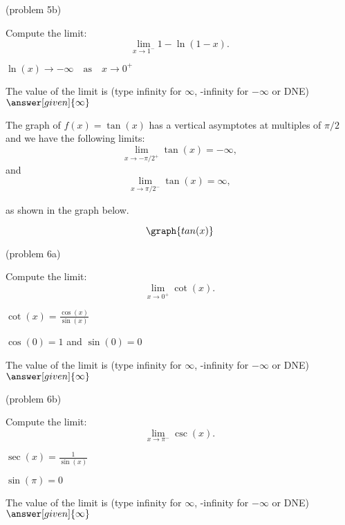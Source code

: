 \documentclass{ximera}
\begin{document}
\begin{problem}(problem 5b)
  
	Compute the limit:
  \[
  \lim_{x \to {1^-}} 1 - \ln(1-x).
  \]
		\begin{hint}
		  $\ln(x) \to -\infty \quad \text{as} \quad x \to 0^+$
		\end{hint}	
		The value of the limit is
		(type infinity for $\infty$, -infinity for $-\infty$ or DNE)
		 $\answer[given]{\infty}$
		
\end{problem}

\begin{example}[example 6]
The graph of $f(x) = \tan(x)$ has a vertical asymptotes at multiples of $\pi/2$ and
we have the following limits: 
\[
\lim_{x\to -\pi/2^+} \tan(x) = -\infty,
\]
and
\[
\lim_{x\to \pi/2^-} \tan(x) = \infty,
\]

as shown in the graph below.
		
			
\[
\graph{tan(x)}
\]
\end{example}

\begin{problem}(problem 6a)
  
	Compute the limit:
  \[
  \lim_{x \to {0^+}} \cot(x).
  \]
		\begin{hint}
		  $\cot(x) = \frac{\cos(x)}{\sin(x)}$
		\end{hint}	
		\begin{hint}
		  $\cos(0) = 1$ and $\sin(0) = 0$
		\end{hint}
		
		The value of the limit is
		(type infinity for $\infty$, -infinity for $-\infty$ or DNE)
		 $\answer[given]{\infty}$
		
\end{problem}

\begin{problem}(problem 6b)
  
	Compute the limit:
  \[
  \lim_{x \to {\pi^-}} \csc(x).
  \]
		\begin{hint}
		  $\sec(x) = \frac{1}{\sin(x)}$
		\end{hint}	
		\begin{hint}
		  $\sin(\pi) = 0$
		\end{hint}
		The value of the limit is
		(type infinity for $\infty$, -infinity for $-\infty$ or DNE)
		 $\answer[given]{\infty}$
		
\end{problem}
\end{document}
